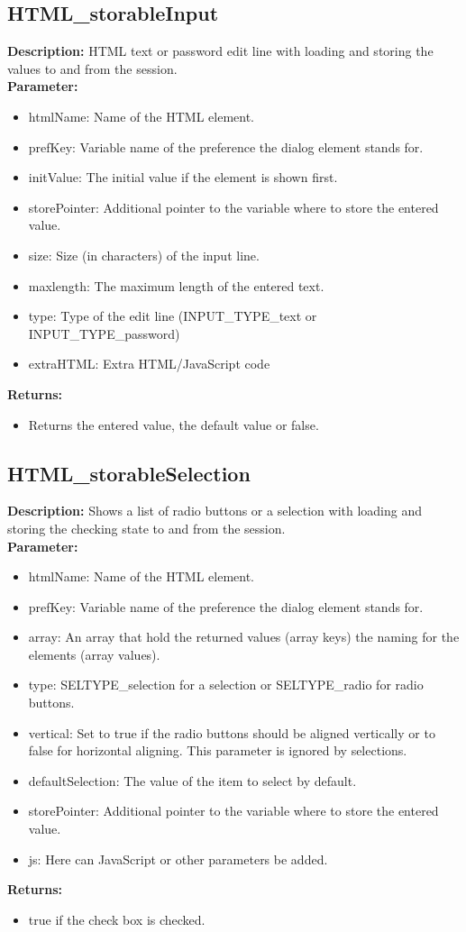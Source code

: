 \subsection{HTML\_storableInput}
\textbf{Description:} HTML text or password edit line with loading and storing the values to and from the session.\\
\textbf{Parameter:}
\begin{itemize}
\item htmlName: Name of the HTML element.
\item prefKey: Variable name of the preference the dialog element stands for.
\item initValue: The initial value if the element is shown first.
\item storePointer: Additional pointer to the variable where to store the entered value.
\item size: Size (in characters) of the input line.
\item maxlength: The maximum length of the entered text.
\item type: Type of the edit line (INPUT\_TYPE\_text or INPUT\_TYPE\_password)
\item extraHTML: Extra HTML/JavaScript code 
\end{itemize}
\textbf{Returns:}
\begin{itemize}
\item Returns the entered value, the default value or false.
\end{itemize}

\subsection{HTML\_storableSelection}
\textbf{Description:} Shows a list of radio buttons or a selection with loading and storing the checking state to and from the session.\\
\textbf{Parameter:}
\begin{itemize}
\item htmlName: Name of the HTML element.
\item prefKey: Variable name of the preference the dialog element stands for.
\item array: An array that hold the returned values (array keys) the naming for the elements (array values).
\item type: SELTYPE\_selection for a selection or SELTYPE\_radio for radio buttons.
\item vertical: Set to true if the radio buttons should be aligned vertically or to false for horizontal aligning. This parameter is ignored by selections.
\item defaultSelection: The value of the item to select by default.
\item storePointer: Additional pointer to the variable where to store the entered value.
\item js: Here can JavaScript or other parameters be added.
\end{itemize}
\textbf{Returns:}
\begin{itemize}
\item true if the check box is checked.
\end{itemize}

